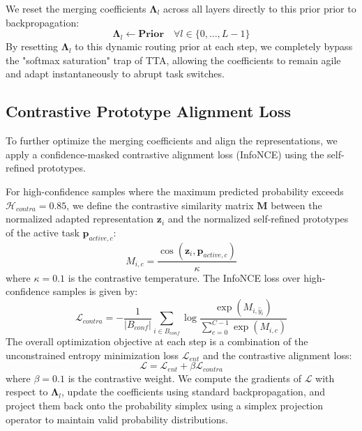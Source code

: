 \documentclass{article}
\theoremstyle{plain}
\theoremstyle{definition}
\theoremstyle{remark}
\begin{document}
We reset the merging coefficients $\boldsymbol{\Lambda}_l$ across all layers directly to this prior prior to backpropagation:
\begin{equation}
    \boldsymbol{\Lambda}_l \leftarrow \textbf{Prior} \quad \forall l \in \{0, \dots, L-1\}
\end{equation}
By resetting $\boldsymbol{\Lambda}_l$ to this dynamic routing prior at each step, we completely bypass the "softmax saturation" trap of TTA, allowing the coefficients to remain agile and adapt instantaneously to abrupt task switches.

\subsection{Contrastive Prototype Alignment Loss}
\label{subsec:loss}

To further optimize the merging coefficients and align the representations, we apply a confidence-masked contrastive alignment loss (InfoNCE) using the self-refined prototypes.

For high-confidence samples where the maximum predicted probability exceeds $\mathcal{H}_{contra} = 0.85$, we define the contrastive similarity matrix $\boldsymbol{M}$ between the normalized adapted representation $\boldsymbol{z}_i$ and the normalized self-refined prototypes of the active task $\boldsymbol{p}_{active, c}$:
\begin{equation}
    M_{i,c} = \frac{\cos\left(\boldsymbol{z}_i, \boldsymbol{p}_{active, c}\right)}{\kappa}
\end{equation}
where $\kappa = 0.1$ is the contrastive temperature. The InfoNCE loss over high-confidence samples is given by:
\begin{equation}
    \mathcal{L}_{contra} = -\frac{1}{|B_{conf}|} \sum_{i \in B_{conf}} \log \frac{\exp(M_{i, \hat{y}_i})}{\sum_{c=0}^{C-1} \exp(M_{i, c})}
\end{equation}
The overall optimization objective at each step is a combination of the unconstrained entropy minimization loss $\mathcal{L}_{ent}$ and the contrastive alignment loss:
\begin{equation}
    \mathcal{L} = \mathcal{L}_{ent} + \beta \mathcal{L}_{contra}
\end{equation}
where $\beta = 0.1$ is the contrastive weight. We compute the gradients of $\mathcal{L}$ with respect to $\boldsymbol{\Lambda}_l$, update the coefficients using standard backpropagation, and project them back onto the probability simplex using a simplex projection operator to maintain valid probability distributions.
\end{document}
